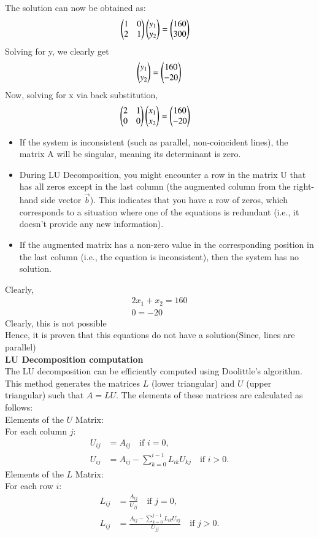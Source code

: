 \documentclass[journal]{IEEEtran}
\begin{document}
The solution can now be obtained as:
\begin{align}
	\begin{pmatrix}1&0\\2&1\end{pmatrix}\begin{pmatrix}y_1 \\ y_2\end{pmatrix} &= \begin{pmatrix}160 \\ 300\end{pmatrix}
\end{align}
Solving for y, we clearly get
\begin{align}
	\begin{pmatrix}y_1 \\ y_2\end{pmatrix} = \begin{pmatrix}160 \\ -20\end{pmatrix}
\end{align}
Now, solving for x via back substitution, 
\begin{align}
	\begin{pmatrix}2&1\\0&0\end{pmatrix}\begin{pmatrix}x_1 \\ x_2\end{pmatrix} &= \begin{pmatrix}160 \\ -20\end{pmatrix}
\end{align}
\begin{itemize}
\item If the system is inconsistent (such as parallel, non-coincident lines), the matrix A will be singular, meaning its determinant is zero.
\item During LU Decomposition, you might encounter a row in the matrix U that has all zeros except in the last column (the augmented column from the right-hand side vector $\vec{b}$). This indicates that you have a row of zeros, which corresponds to a situation where one of the equations is redundant (i.e., it doesn't provide any new information).
\item If the augmented matrix has a non-zero value in the corresponding position in the last column (i.e., the equation is inconsistent), then the system has no solution.
\end{itemize}
Clearly, 
\begin{align}
    2x_1+x_2=160\\
    0=-20
\end{align}
Clearly, this is not possible \\
Hence, it is proven that this equations do not have a solution(Since, lines are parallel)\\
\textbf{LU Decomposition computation}\\
The LU decomposition can be efficiently computed using Doolittle's algorithm. This method generates the matrices \( L \) (lower triangular) and \( U \) (upper triangular) such that \( A = LU \). The elements of these matrices are calculated as follows: \\
Elements of the \( U \) Matrix:  \\
For each column \( j \):
\begin{align}
	U_{ij} &= A_{ij} \quad \text{if } i = 0, \\
	U_{ij} &= A_{ij} - \sum_{k=0}^{i-1} L_{ik} U_{kj} \quad \text{if } i > 0.
\end{align}
Elements of the \( L \) Matrix: \\
For each row \( i \):
\begin{align}
	L_{ij} &= \frac{A_{ij}}{U_{jj}} \quad \text{if } j = 0, \\
	L_{ij} &= \frac{A_{ij} - \sum_{k=0}^{j-1} L_{ik} U_{kj}}{U_{jj}} \quad \text{if } j > 0.
\end{align}
\end{document}
